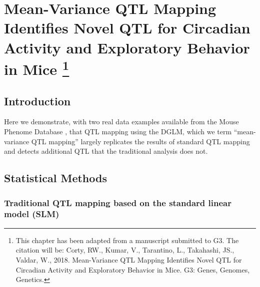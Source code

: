 \chapter[
    Mean-Variance QTL Mapping Identifies Novel QTL for Circadian Activity and Exploratory Behavior in Mice
]
{
    Mean-Variance QTL Mapping Identifies Novel QTL for Circadian Activity and Exploratory Behavior in Mice
    \footnote{This chapter has been adapted from a manuscript submitted to G3.
    The citation will be: Corty, RW., Kumar, V., Tarantino, L., Takahashi, JS., Valdar, W., 2018. Mean-Variance QTL Mapping Identifies Novel QTL for Circadian Activity and Exploratory Behavior in Mice. G3: Genes, Genomes, Genetics.}
}
\label{chap:mvqtl_reanalyses}

\section{Introduction}

Here we demonstrate, with two real data examples available from the Mouse Phenome Database \citep{Bogue2015}, that QTL mapping using the DGLM, which we term ``mean-variance QTL mapping'' largely replicates the results of standard QTL mapping and detects additional QTL that the traditional analysis does not.

\section{Statistical Methods}

\subsection{Traditional QTL mapping based on the standard linear model (SLM)}

